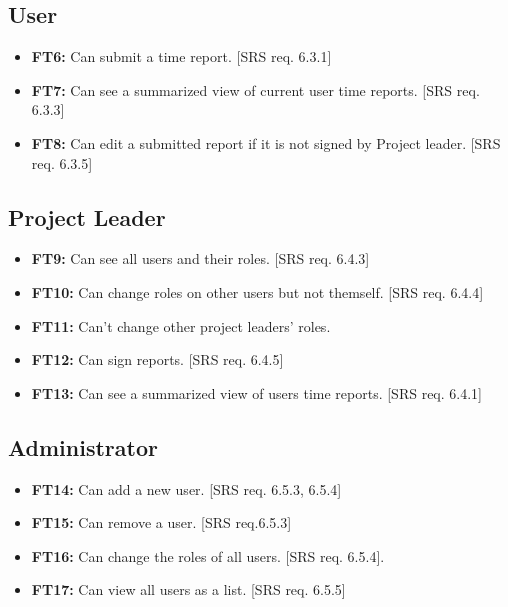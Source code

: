 \documentclass{article}
\begin{document}
		\subsection{User}
		
		\begin{itemize}
  			\item \textbf{FT6:} Can submit a time report. [SRS req. 6.3.1]
  			\item \textbf{FT7:} Can see a summarized view of current user time reports. [SRS req. 6.3.3]
  			\item \textbf{FT8:} Can edit a submitted report if it is not signed by Project leader. [SRS req. 6.3.5]

		\end{itemize}
		
		\subsection{Project Leader}
		
			\begin{itemize}
  			\item \textbf{FT9:} Can see all users and their roles. [SRS req. 6.4.3]

  			\item \textbf{FT10:} Can change roles on other users but not themself. [SRS req. 6.4.4]
  			
  			\item \textbf{FT11:} Can’t change other project leaders' roles.
  			
  			\item \textbf{FT12:} Can sign reports. [SRS req. 6.4.5]

  			\item \textbf{FT13:} Can see a summarized view of users time reports. [SRS req. 6.4.1]

		\end{itemize}
		
		\subsection{Administrator}
		
			\begin{itemize}
  			\item \textbf{FT14:} Can add a new user. [SRS req. 6.5.3, 6.5.4]

  			\item \textbf{FT15:} Can remove a user. [SRS req.6.5.3]
  			
  			\item \textbf{FT16:} Can change the roles of all users. [SRS req. 6.5.4].
  			
  			\item \textbf{FT17:} Can view all users as a list. [SRS req. 6.5.5]

		\end{itemize}
		
\end{document}
